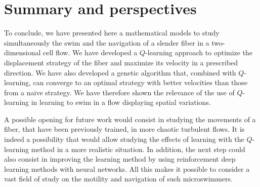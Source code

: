 \documentclass[aps,pre,reprint,superscriptaddress]{revtex4-2}
\begin{document}
\section{Summary and perspectives}

To conclude, we have presented here a mathematical models to study simultaneously the swim and the navigation of a slender fiber in a two-dimensional cell flow. We have developed a $Q$-learning approach to optimize the displacement strategy of the fiber and maximize its velocity in a prescribed direction. We have also developed a genetic algorithm that, combined with $Q$-learning, can converge to an optimal strategy with better velocities than those from a naive strategy. We have therefore shown the relevance of the use of $Q$-learning in learning to swim in a flow displaying spatial variations.

A possible opening for future work would consist in studying the movements of a fiber, that have been previously trained, in more chaotic turbulent flows. It is indeed a possibility that would allow studying the effects of learning with the $Q$-learning method in a more realistic situation. In addition, the next step could also consist in improving the learning method by using reinforcement deep learning methods with neural networks. All this makes it possible to consider a vast field of study on the motility and navigation of such microswimmers.



%

\end{document}
